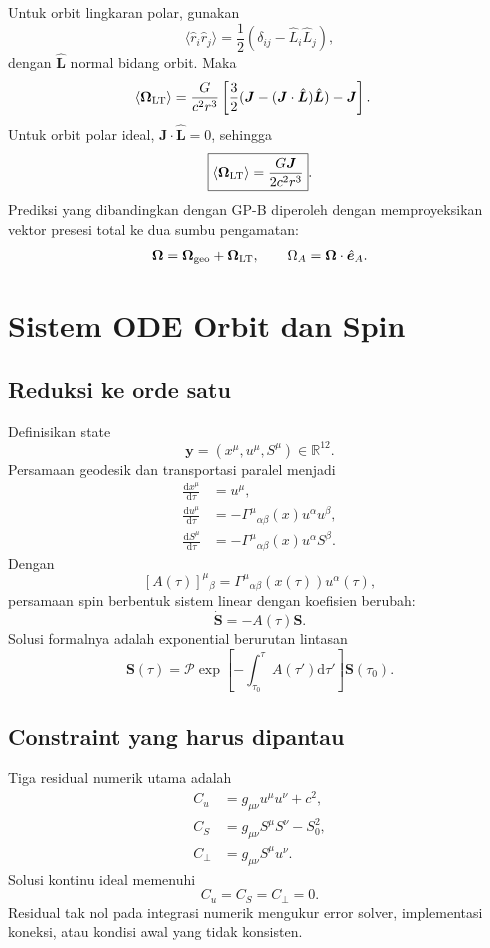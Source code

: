 \documentclass[12pt,a4paper]{report}
\newcommand{\dd}{\mathrm{d}}
\begin{document}
Untuk orbit lingkaran polar, gunakan
\[
 \langle\hat r_i\hat r_j\rangle
 =\frac12(\delta_{ij}-\hat L_i\hat L_j),
\]
dengan $\hat{\bm L}$ normal bidang orbit. Maka
\begin{align}
 \left\langle\bm\Omega_{\rm LT}\right\rangle
 &=\frac{G}{c^2r^3}\left[
 \frac32(\bm J-(\bm J\cdot\hat{\bm L})\hat{\bm L})-\bm J
 \right].
\end{align}
Untuk orbit polar ideal, $\bm J\cdot\hat{\bm L}=0$, sehingga
\[
 \boxed{
 \left\langle\bm\Omega_{\rm LT}\right\rangle
 =\frac{G\bm J}{2c^2r^3}}.
\]
Prediksi yang dibandingkan dengan GP-B diperoleh dengan memproyeksikan vektor
presesi total ke dua sumbu pengamatan:
\[
 \bm\Omega=\bm\Omega_{\rm geo}+\bm\Omega_{\rm LT},
 \qquad
 \Omega_A=\bm\Omega\cdot\hat{\bm e}_A.
\]

\chapter{Sistem ODE Orbit dan Spin}

\section{Reduksi ke orde satu}

Definisikan state
\[
 \bm y=(x^\mu,u^\mu,S^\mu)\in\mathbb{R}^{12}.
\]
Persamaan geodesik dan transportasi paralel menjadi
\begin{align}
 \frac{\dd x^\mu}{\dd\tau}&=u^\mu,\\
 \frac{\dd u^\mu}{\dd\tau}
 &=-\Gamma^\mu{}_{\alpha\beta}(x)u^\alpha u^\beta,\\
 \frac{\dd S^\mu}{\dd\tau}
 &=-\Gamma^\mu{}_{\alpha\beta}(x)u^\alpha S^\beta.
\end{align}
Dengan
\[
 \left[A(\tau)\right]^\mu{}_{\beta}
 =\Gamma^\mu{}_{\alpha\beta}(x(\tau))u^\alpha(\tau),
\]
persamaan spin berbentuk sistem linear dengan koefisien berubah:
\[
 \dot{\bm S}=-A(\tau)\bm S.
\]
Solusi formalnya adalah exponential berurutan lintasan
\[
 \bm S(\tau)
 =\mathcal{P}\exp\left[-\int_{\tau_0}^{\tau}A(\tau')\dd\tau'\right]
 \bm S(\tau_0).
\]

\section{Constraint yang harus dipantau}

Tiga residual numerik utama adalah
\begin{align}
 C_u&=g_{\mu\nu}u^\mu u^\nu+c^2,\\
 C_S&=g_{\mu\nu}S^\mu S^\nu-S_0^2,\\
 C_\perp&=g_{\mu\nu}S^\mu u^\nu.
\end{align}
Solusi kontinu ideal memenuhi
\[
 C_u=C_S=C_\perp=0.
\]
Residual tak nol pada integrasi numerik mengukur error solver, implementasi koneksi,
atau kondisi awal yang tidak konsisten.
\end{document}

